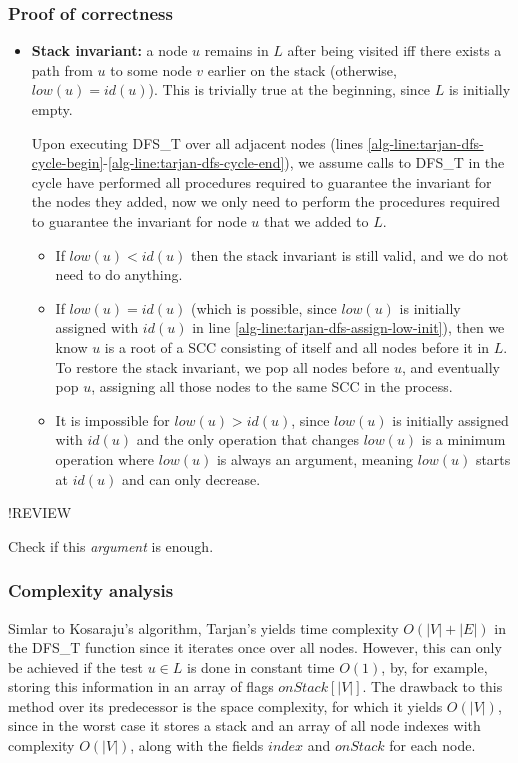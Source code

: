 \subsubsection{Proof of correctness}
\begin{itemize}
    \item \textbf{Stack invariant:} a node $u$ remains in $L$ after being visited iff there exists a path from $u$ to some node $v$ earlier on the stack (otherwise, $low(u)=id(u)$). This is trivially true at the beginning, since $L$ is initially empty.\par
    Upon executing \textsc{DFS\_T} over all adjacent nodes (lines \ref*{alg-line:tarjan-dfs-cycle-begin}-\ref*{alg-line:tarjan-dfs-cycle-end}), we assume calls to \textsc{DFS\_T} in the cycle have performed all procedures required to guarantee the invariant for the nodes they added, now we only need to perform the procedures required to guarantee the invariant for node $u$ that we added to $L$.
    \begin{itemize}
        \item If $low(u) < id(u)$ then the stack invariant is still valid, and we do not need to do anything.
        \item If $low(u)=id(u)$ (which is possible, since $low(u)$ is initially assigned with $id(u)$ in line \ref{alg-line:tarjan-dfs-assign-low-init}), then we know $u$ is a root of a \acrshort*{SCC} consisting of itself and all nodes before it in $L$. To restore the stack invariant, we pop all nodes before $u$, and eventually pop $u$, assigning all those nodes to the same \acrshort*{SCC} in the process.
        \item It is impossible for $low(u) > id(u)$, since $low(u)$ is initially assigned with $id(u)$ and the only operation that changes $low(u)$ is a minimum operation where $low(u)$ is always an argument, meaning $low(u)$ starts at $id(u)$ and can only decrease.
    \end{itemize}
\end{itemize}
!REVIEW
\par
Check if this \emph{argument} is enough.
\subsubsection{Complexity analysis}
Simlar to Kosaraju's algorithm, Tarjan's yields time complexity $O(|V|+|E|)$ in the \textsc{DFS\_T} function since it iterates once over all nodes. However, this can only be achieved if the test $u \in L$ is done in constant time $O(1)$, by, for example, storing this information in an array of flags $onStack[|V|]$.
The drawback to this method over its predecessor is the space complexity, for which it yields $O(|V|)$, since in the worst case it stores a stack and an array of all node indexes with complexity $O(|V|)$, along with the fields $index$ and $onStack$ for each node. 